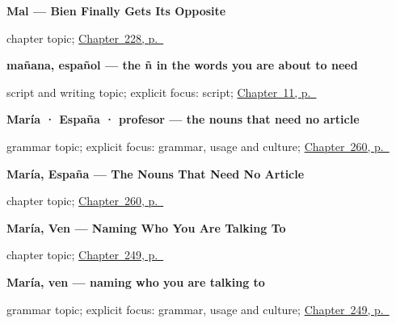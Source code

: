 \noindent\begin{minipage}[t]{\linewidth}
\raggedright
\textbf{Mal --- Bien Finally Gets Its Opposite}\par
\footnotesize chapter topic; \hyperref[ch:mal]{Chapter~228, p.~\pageref*{ch:mal}}
\end{minipage}\par\smallskip

\noindent\begin{minipage}[t]{\linewidth}
\raggedright
\textbf{mañana, español — the ñ in the words you are about to need}\par
\footnotesize script and writing topic; explicit focus: script; \hyperref[ch:enye-and-marks]{Chapter~11, p.~\pageref*{ch:enye-and-marks}}
\end{minipage}\par\smallskip

\noindent\begin{minipage}[t]{\linewidth}
\raggedright
\textbf{María · España · profesor — the nouns that need no article}\par
\footnotesize grammar topic; explicit focus: grammar, usage and culture; \hyperref[ch:nombres-propios]{Chapter~260, p.~\pageref*{ch:nombres-propios}}
\end{minipage}\par\smallskip

\noindent\begin{minipage}[t]{\linewidth}
\raggedright
\textbf{María, España --- The Nouns That Need No Article}\par
\footnotesize chapter topic; \hyperref[ch:nombres-propios]{Chapter~260, p.~\pageref*{ch:nombres-propios}}
\end{minipage}\par\smallskip

\noindent\begin{minipage}[t]{\linewidth}
\raggedright
\textbf{María, Ven --- Naming Who You Are Talking To}\par
\footnotesize chapter topic; \hyperref[ch:maria-ven]{Chapter~249, p.~\pageref*{ch:maria-ven}}
\end{minipage}\par\smallskip

\noindent\begin{minipage}[t]{\linewidth}
\raggedright
\textbf{María, ven — naming who you are talking to}\par
\footnotesize grammar topic; explicit focus: grammar, usage and culture; \hyperref[ch:maria-ven]{Chapter~249, p.~\pageref*{ch:maria-ven}}
\end{minipage}\par\smallskip

